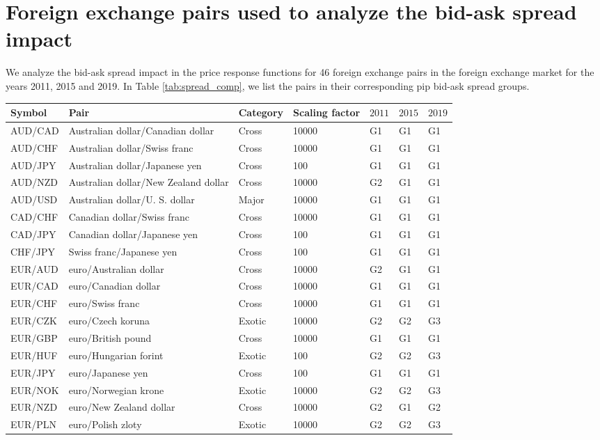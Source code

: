 \section{Foreign exchange pairs used to analyze the bid-ask spread impact}
\label{app:fx_pairs_spread}

We analyze the bid-ask spread impact in the price response functions for 46
foreign exchange pairs in the foreign exchange market for the years 2011, 2015
and 2019. In Table \ref{tab:spread_comp}, we list the pairs in their
corresponding pip bid-ask spread groups.

\begin{table*}
\begin{center}
\begin{centering}
    \begin{threeparttable}
    \caption{Foreign exchange pairs used in Sect. \ref{sec:spread_impact}.}
    \label{tab:spread_comp}
    \begin{tabular}{lllllll}
    \hline
    Symbol & Pair & Category & Scaling factor & $2011$ & $2015$ & $2019$\tabularnewline
    \hline
    AUD/CAD & Australian dollar/Canadian dollar & Cross & 10000 & G1 & G1 & G1\tabularnewline
    AUD/CHF & Australian dollar/Swiss franc & Cross & 10000 & G1 & G1 & G1\tabularnewline
    AUD/JPY & Australian dollar/Japanese yen & Cross & 100 & G1 & G1 & G1\tabularnewline
    AUD/NZD & Australian dollar/New Zealand dollar & Cross & 10000 & G2 & G1 & G1\tabularnewline
    AUD/USD & Australian dollar/U. S. dollar & Major & 10000 & G1 & G1 & G1\tabularnewline
    CAD/CHF & Canadian dollar/Swiss franc & Cross & 10000 & G1 & G1 & G1\tabularnewline
    CAD/JPY & Canadian dollar/Japanese yen & Cross & 100 & G1 & G1 & G1\tabularnewline
    CHF/JPY & Swiss franc/Japanese yen & Cross & 100 & G1 & G1 & G1\tabularnewline
    EUR/AUD & euro/Australian dollar & Cross & 10000 & G2 & G1 & G1\tabularnewline
    EUR/CAD & euro/Canadian dollar & Cross & 10000 & G1 & G1 & G1\tabularnewline
    EUR/CHF & euro/Swiss franc & Cross & 10000 & G1 & G1 & G1\tabularnewline
    EUR/CZK & euro/Czech koruna & Exotic & 10000 & G2 & G2 & G3\tabularnewline
    EUR/GBP & euro/British pound & Cross & 10000 & G1 & G1 & G1\tabularnewline
    EUR/HUF & euro/Hungarian forint & Exotic & 100 & G2 & G2 & G3\tabularnewline
    EUR/JPY & euro/Japanese yen & Cross & 100 & G1 & G1 & G1\tabularnewline
    EUR/NOK & euro/Norwegian krone & Exotic & 10000 & G2 & G2 & G3\tabularnewline
    EUR/NZD & euro/New Zealand dollar & Cross & 10000 & G2 & G1 & G2\tabularnewline
    EUR/PLN & euro/Polish zloty & Exotic & 10000 & G2 & G2 & G3\tabularnewline

\end{tabular}
\end{threeparttable}
\end{centering}
\end{center}
\end{table*}
